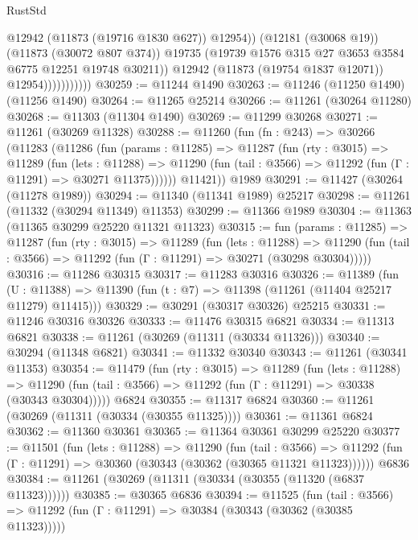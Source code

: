 \begin{lexlean}{RustStd}
\begin{coremodule}
                                @12942
                                (@11873 (@19716 @1830 @627))
                                @12954))
                            (@12181 (@30068 @19))
                            (@11873 (@30072 @807 @374))
                            @19735
                            (@19739 @1576 @315 @27 @3653 @3584 @6775 @12251 @19748 @30211))
                          @12942
                          (@11873 (@19754 @1837 @12071))
                          @12954)))))))))))
@30259 := @11244 @1490
@30263 := @11246 (@11250 @1490) (@11256 @1490)
@30264 := @11265 @25214
@30266 := @11261 (@30264 @11280)
@30268 := @11303 (@11304 @1490)
@30269 := @11299 @30268
@30271 := @11261 (@30269 @11328)
@30288 := @11260
    (fun (fn : @243) =>
    @30266
      (@11283
        (@11286
          (fun (params : @11285) =>
          @11287
            (fun (rty : @3015) =>
            @11289
              (fun (lets : @11288) =>
              @11290 (fun (tail : @3566) => @11292 (fun (Γ : @11291) => @30271 @11375))))))
        @11421))
    @1989
@30291 := @11427 (@30264 (@11278 @1989))
@30294 := @11340 (@11341 @1989) @25217
@30298 := @11261 (@11332 (@30294 @11349) @11353)
@30299 := @11366 @1989
@30304 := @11363 (@11365 @30299 @25220 @11321 @11323)
@30315 := fun (params : @11285) =>
  @11287
    (fun (rty : @3015) =>
    @11289
      (fun (lets : @11288) =>
      @11290 (fun (tail : @3566) => @11292 (fun (Γ : @11291) => @30271 (@30298 @30304)))))
@30316 := @11286 @30315
@30317 := @11283 @30316
@30326 := @11389
    (fun (U : @11388) => @11390 (fun (t : @7) => @11398 (@11261 (@11404 @25217 @11279) @11415)))
@30329 := @30291 (@30317 @30326) @25215
@30331 := @11246 @30316 @30326
@30333 := @11476 @30315 @6821
@30334 := @11313 @6821
@30338 := @11261 (@30269 (@11311 (@30334 @11326)))
@30340 := @30294 (@11348 @6821)
@30341 := @11332 @30340
@30343 := @11261 (@30341 @11353)
@30354 := @11479
    (fun (rty : @3015) =>
    @11289
      (fun (lets : @11288) =>
      @11290 (fun (tail : @3566) => @11292 (fun (Γ : @11291) => @30338 (@30343 @30304)))))
    @6824
@30355 := @11317 @6824
@30360 := @11261 (@30269 (@11311 (@30334 (@30355 @11325))))
@30361 := @11361 @6824
@30362 := @11360 @30361
@30365 := @11364 @30361 @30299 @25220
@30377 := @11501
    (fun (lets : @11288) =>
    @11290
      (fun (tail : @3566) =>
      @11292 (fun (Γ : @11291) => @30360 (@30343 (@30362 (@30365 @11321 @11323))))))
    @6836
@30384 := @11261 (@30269 (@11311 (@30334 (@30355 (@11320 (@6837 @11323))))))
@30385 := @30365 @6836
@30394 := @11525
    (fun (tail : @3566) => @11292 (fun (Γ : @11291) => @30384 (@30343 (@30362 (@30385 @11323)))))

\end{coremodule}
\end{lexlean}
